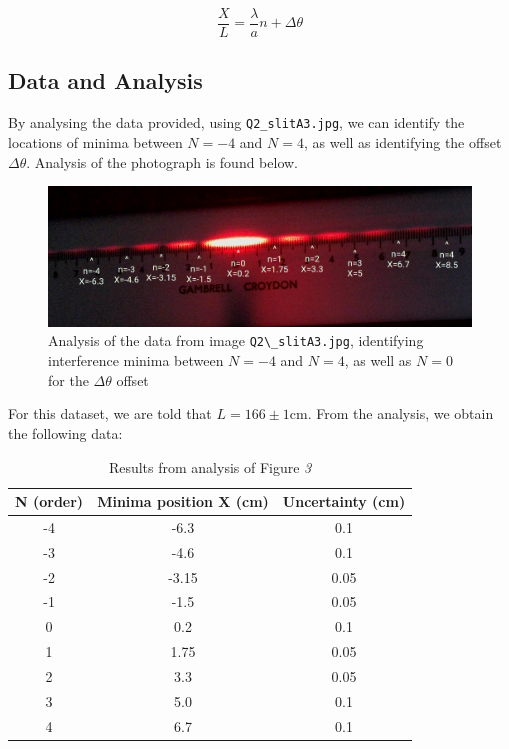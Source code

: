 \documentclass[a4paper]{article}
\begin{document}
\begin{equation}
\frac XL=\frac\lambda an+\Delta\theta
\end{equation}
\newpage
\subsection{Data and Analysis}

By analysing the data provided, using \lstinline$Q2_slitA3.jpg$, we can identify the locations of minima between $N=-4$ and $N=4$, as well as identifying the offset $\Delta\theta$. Analysis of the photograph is found below.

\begin{figure}[h!]
\centerline{\includegraphics[scale=0.5]{L166pm1.png}}
\caption{Analysis of the data from image {\lstinline$Q2\_slitA3.jpg$}, identifying interference minima between $N=-4$ and $N=4$, as well as $N=0$ for the $\Delta\theta$ offset}
\label{fig:l116pm1}
\end{figure}

For this dataset, we are told that $L=166\pm1 \text{cm}$. From the analysis, we obtain the following data:

\begin{table}[h!]
\centering
\begin{tabular}{ccc}
\hline
N (order) & Minima position X (cm) & Uncertainty (cm)\\ \hline
-4 & -6.3 & 0.1 \\
-3 & -4.6 & 0.1 \\
-2 & -3.15 & 0.05 \\
-1 & -1.5 & 0.05 \\
0 & 0.2 & 0.1 \\
1 & 1.75 & 0.05 \\
2 & 3.3 & 0.05 \\
3 & 5.0 & 0.1 \\
4 & 6.7 & 0.1 \\
\end{tabular}
\caption{\label{tab:l116_table}Results from analysis of Figure \emph{3}}
\end{table}
\end{document}
